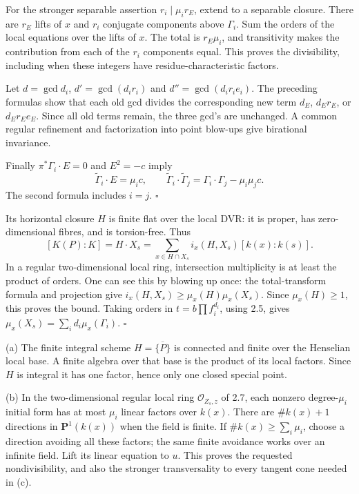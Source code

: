 \documentclass[11pt]{article}
\let\chapterexercise\exercise
\renewcommand{\exercise}[2]{\Needspace{8\baselineskip}\chapterexercise{#1}{#2}}
\begin{document}
For the stronger separable assertion $r_i\mid\mu_i r_E$, extend to a separable closure. There are $r_E$ lifts of $x$ and $r_i$ conjugate components above $\Gamma_i$. Sum the orders of the local equations over the lifts of $x$. The total is $r_E\mu_i$, and transitivity makes the contribution from each of the $r_i$ components equal. This proves the divisibility, including when these integers have residue-characteristic factors.

Let $d=\gcd d_i$, $d'=\gcd(d_ir_i)$ and $d''=\gcd(d_ir_ie_i)$. The preceding formulas show that each old gcd divides the corresponding new term $d_E$, $d_Er_E$, or $d_Er_Ee_E$. Since all old terms remain, the three gcd's are unchanged. A common regular refinement and factorization into point blow-ups give birational invariance.

Finally $\pi^*\Gamma_i\cdot E=0$ and $E^2=-c$ imply
\[ \widetilde\Gamma_i\cdot E=\mu_i c,\qquad
\widetilde\Gamma_i\cdot\widetilde\Gamma_j=\Gamma_i\cdot\Gamma_j-\mu_i\mu_jc. \]
The second formula includes $i=j$. \hfill$\square$

\pf Its horizontal closure $H$ is finite flat over the local DVR: it is proper, has zero-dimensional fibres, and is torsion-free. Thus
\[ [K(P):K]=H\cdot X_s=\sum_{x\in H\cap X_s}i_x(H,X_s)[k(x):k(s)]. \]
In a regular two-dimensional local ring, intersection multiplicity is at least the product of orders. One can see this by blowing up once: the total-transform formula and projection give $i_x(H,X_s)\ge\mu_x(H)\mu_x(X_s)$. Since $\mu_x(H)\ge1$, this proves the bound. Taking orders in $t=b\prod f_i^{d_i}$, using 2.5, gives $\mu_x(X_s)=\sum_i d_i\mu_x(\Gamma_i)$. \hfill$\square$

\pf (a) The finite integral scheme $H=\overline{\{P\}}$ is connected and finite over the Henselian local base. A finite algebra over that base is the product of its local factors. Since $H$ is integral it has one factor, hence only one closed special point.

(b) In the two-dimensional regular local ring $\mathcal O_{Z_s,z}$ of 2.7, each nonzero degree-$\mu_i$ initial form has at most $\mu_i$ linear factors over $k(x)$. There are $\#k(x)+1$ directions in $\mathbf P^1(k(x))$ when the field is finite. If $\#k(x)\ge\sum_i\mu_i$, choose a direction avoiding all these factors; the same finite avoidance works over an infinite field. Lift its linear equation to $u$. This proves the requested nondivisibility, and also the stronger transversality to every tangent cone needed in (c).
\end{document}
